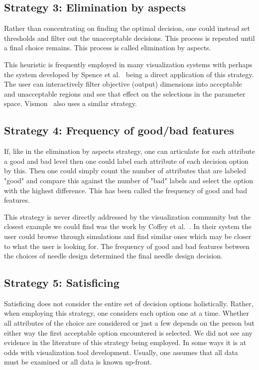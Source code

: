 \subsection{Strategy 3: Elimination by aspects}\label{elimination-by-aspects}

Rather than concentrating on finding the optimal decision, one could
instead set thresholds and filter out the unacceptable decisions. This process
is repeated until a final choice remains. This process is called
elimination by aspects.

This heuristic is frequently employed in many visualization systems with
perhaps the system developed by Spence et al.~\citep{Spence:1995} being a
direct application of this strategy. The user can interactively filter
objective (output) dimensions into acceptable and unacceptable regions and
see that effect on the selections in the parameter space. 
Vismon~\citep{Booshehrian:2012} also uses a similar strategy.

\subsection{Strategy 4: Frequency of good/bad features}
\label{frequency-of-goodbad-features}

If, like in the elimination by aspects strategy, one can articulate for
each attribute a good and bad level then one could label each attribute
of each decision option by this. Then one could simply count the number of
attributes that are labeled "good" and compare this against the number of
"bad" labels and select the option with the highest difference. This has
been called the frequency of good and bad features.

This strategy is never directly addressed by the visualization community
but the closest example we could find was the work by 
Coffey et al.~\citep{Coffey:2013}. In their system the user could browse
through simulations and find similar ones which may be closer to what
the user is looking for. The frequency of good and bad features between the
choices of needle design determined the final needle design decision.

\subsection{Strategy 5: Satisficing}\label{satisficing}

Satisficing does not consider the entire set of decision options holistically.
Rather, when employing this strategy, one considers each option one at a time.
Whether all attributes of the choice are considered or just a few depends on
the person but either way the first acceptable option encountered is selected.
We did not see any evidence in the literature of this strategy being
employed. In some ways it is at odds with visualization tool development.
Usually, one assumes that all data must be examined or all data is known
up-front.

